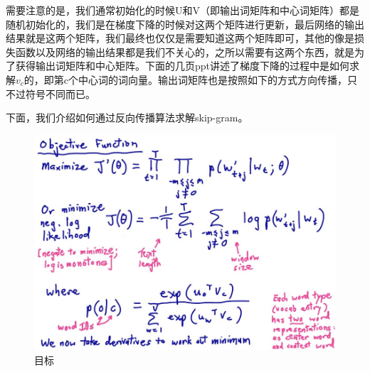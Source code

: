 	
	需要注意的是，我们通常初始化的时候U和V（即输出词矩阵和中心词矩阵）都是随机初始化的，我们是在梯度下降的时候对这两个矩阵进行更新，最后网络的输出结果就是这两个矩阵，我们最终也仅仅是需要知道这两个矩阵即可，其他的像是损失函数以及网络的输出结果都是我们不关心的，之所以需要有这两个东西，就是为了获得输出词矩阵和中心矩阵。下面的几页ppt讲述了梯度下降的过程中是如何求解$v_c$的，即第c个中心词的词向量。输出词矩阵也是按照如下的方式方向传播，只不过符号不同而已。
	
	下面，我们介绍如何通过反向传播算法求解skip-gram。
	
%	
%	


	\begin{figure}[!htbp]
	\centering\includegraphics[width=6.5in]{img/6-5.png}
	\caption{目标}\label{fig:6-5}
	\end{figure}	
	
